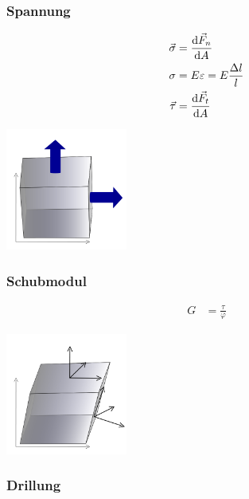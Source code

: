 \begin{multicols}{2}{}
\subsubsection{Spannung}
\begin{align*}
\vec{\sigma}&=\frac{\mathop{}\!\mathrm{d}\vec{F}_n}{\mathop{}\!\mathrm{d} A}\\
\sigma&=E \varepsilon=E\frac{\Delta l}{l}\\
\vec{\tau}&= \frac{\mathop{}\!\mathrm{d}\vec{F}_t}{\mathop{}\!\mathrm{d} A}
\end{align*}
\hfill

\begin{center}
 \includegraphics[width=40mm,height=40mm,keepaspectratio=true]{./Physik/Bilder/Spannung.png}
\end{center}
\end{multicols}


\subsubsection{Schubmodul}

\begin{multicols}{2}{}
\begin{align*}
G&=\frac{\tau}{\varphi}
\end{align*}
\hfill

\begin{center}
 \includegraphics[width=40mm,height=40mm,keepaspectratio=true]{./Physik/Bilder/Tangentialspannung.png}
\end{center}
\end{multicols}


\subsubsection{Drillung}

